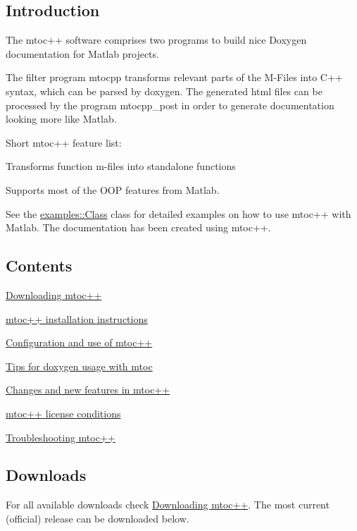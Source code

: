 \hypertarget{index_intro}{}\subsection{Introduction}\label{index_intro}
The mtoc++ software comprises two programs to build nice Doxygen documentation for Matlab projects.

The filter program \textquotesingle{}mtocpp\textquotesingle{} transforms relevant parts of the M-\/\+Files into C++ syntax, which can be parsed by doxygen. The generated html files can be processed by the program \textquotesingle{}mtocpp\+\_\+post\textquotesingle{} in order to generate documentation looking more like Matlab.

Short mtoc++ feature list\+:
\begin{DoxyItemize}
\item Transforms function m-\/files into standalone functions
\item Supports most of the O\+O\+P features from Matlab.
\end{DoxyItemize}

See the \hyperlink{classexamples_1_1_class}{examples\+::\+Class} class for detailed examples on how to use mtoc++ with Matlab. The documentation has been created using mtoc++.\hypertarget{index_Contents}{}\subsection{Contents}\label{index_Contents}

\begin{DoxyItemize}
\item \hyperlink{download}{Downloading mtoc++}
\item \hyperlink{install}{mtoc++ installation instructions}
\item \hyperlink{tools}{Configuration and use of mtoc++}
\item \hyperlink{tips}{Tips for doxygen usage with mtoc}
\item \hyperlink{changes}{Changes and new features in mtoc++}
\item \hyperlink{licensing}{mtoc++ license conditions}
\item \hyperlink{troubleshooting}{Troubleshooting mtoc++}
\end{DoxyItemize}\hypertarget{index_Downloads}{}\subsection{Downloads}\label{index_Downloads}
For all available downloads check \hyperlink{download}{Downloading mtoc++}. The most current (official) release can be downloaded below.

